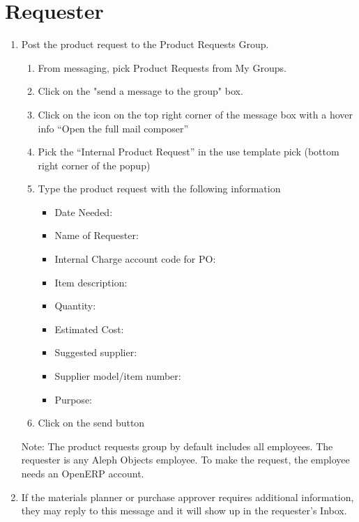 %
%
%
%
%


\section{Requester}

\begin{enumerate}
\item Post the product request to the Product Requests Group.
  \begin{enumerate}
  \item From messaging, pick Product Requests from My Groups.
  \item Click on the "send a message to the group" box.
  \item Click on the icon on the top right corner of the message box with a hover info “Open the full mail composer”
  \item Pick the “Internal Product Request” in the use template pick (bottom right corner of the popup)
  \item Type the product request with the following information
    \begin{itemize}
    \item Date Needed:
    \item Name of Requester:
    \item Internal Charge account code for PO:
    \item Item description:
    \item Quantity:
    \item Estimated Cost:
    \item Suggested supplier:
    \item Supplier model/item number:
    \item Purpose: 
    \end{itemize}
  \item Click on the send button
  \end{enumerate}
Note: The product requests group by default includes all employees. The requester is any Aleph Objects employee. To make the request, the employee needs an OpenERP account.
\item If the materials planner or purchase approver requires additional information, they may reply to this message and it will show up in the requester's Inbox.
\end{enumerate}

